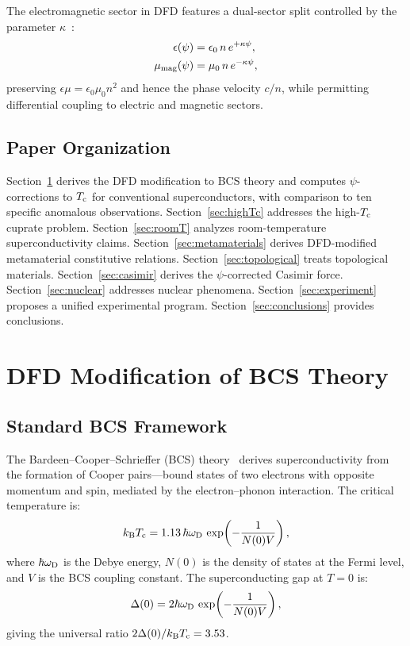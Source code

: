\documentclass[aps,prb,twocolumn,superscriptaddress,floatfix,nofootinbib,longbibliography]{revtex4-2}
\newcommand{\kB}{k_{\rm B}}
\newcommand{\Tc}{T_{\rm c}}
\newcommand{\wD}{\omega_{\rm D}}
\begin{document}
The electromagnetic sector in DFD features a dual-sector split controlled
by the parameter $\kappa$~\cite{Alcock2025EM}:
\begin{align}
\epsilon(\psi) &= \epsilon_0\,n\,e^{+\kappa\psi}, \label{eq:eps-psi}\\
\mu_{\rm mag}(\psi) &= \mu_0\,n\,e^{-\kappa\psi}, \label{eq:mu-psi}
\end{align}
preserving $\epsilon\mu = \epsilon_0\mu_0 n^2$ and hence the phase
velocity $c/n$, while permitting differential coupling to electric and
magnetic sectors.

\subsection{Paper Organization}

Section~\ref{sec:bcs} derives the DFD modification to BCS theory and
computes $\psi$-corrections to $\Tc$ for conventional superconductors,
with comparison to ten specific anomalous observations.
Section~\ref{sec:highTc} addresses the high-$\Tc$ cuprate problem.
Section~\ref{sec:roomT} analyzes room-temperature superconductivity
claims.
Section~\ref{sec:metamaterials} derives DFD-modified metamaterial
constitutive relations.
Section~\ref{sec:topological} treats topological materials.
Section~\ref{sec:casimir} derives the $\psi$-corrected Casimir force.
Section~\ref{sec:nuclear} addresses nuclear phenomena.
Section~\ref{sec:experiment} proposes a unified experimental program.
Section~\ref{sec:conclusions} provides conclusions.


\section{DFD Modification of BCS Theory}\label{sec:bcs}

\subsection{Standard BCS Framework}

The Bardeen--Cooper--Schrieffer (BCS) theory~\cite{BCS1957} derives
superconductivity from the formation of Cooper pairs---bound states of
two electrons with opposite momentum and spin, mediated by the
electron--phonon interaction.  The critical temperature is:
\begin{equation}
\kB\Tc = 1.13\,\hbar\wD\,\exp\!\left(-\frac{1}{N(0)V}\right),
\label{eq:bcs-tc}
\end{equation}
where $\hbar\wD$ is the Debye energy, $N(0)$ is the density of states at
the Fermi level, and $V$ is the BCS coupling constant.  The
superconducting gap at $T = 0$ is:
\begin{equation}
\Delta(0) = 2\hbar\wD\,\exp\!\left(-\frac{1}{N(0)V}\right),
\label{eq:bcs-gap}
\end{equation}
giving the universal ratio $2\Delta(0)/\kB\Tc = 3.53$.
\end{document}
